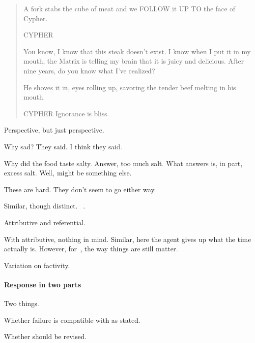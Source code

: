 \begin{note}
  \begin{quote}
    A fork stabs the cube of meat and we FOLLOW it UP TO the face of Cypher.

    CYPHER

    You know, I know that this steak doesn't exist.
    I know when I put it in my mouth, the Matrix is telling my brain that it is juicy and delicious.
    After nine years, do you know what I've realized?

    He shoves it in, eyes rolling up, savoring the tender beef melting in his mouth.

    CYPHER
    Ignorance is bliss.
  \end{quote}

  Perspective, but just perspective.
\end{note}


\begin{note}
  Why sad?
  They said.
  I think they said.

  Why did the food taste salty.
  Answer, too much salt.
  What answers is, in part, excess salt.
  Well, might be something else.

  {
    \color{red}
    These are hard.
    They don't seem to go either way.
  }
\end{note}

\begin{note}
  Similar, though distinct.
  ~\cite{Donnellan:1966wt}.

  Attributive and referential.

  With attributive, nothing in mind.
  Similar, here the agent gives up what the time actually is.
  However, for~\citeauthor{Donnellan:1966wt}, the way things are still matter.
\end{note}


\begin{note}
  Variation on factivity.
\end{note}


\paragraph{Response in two parts}

\begin{note}
  Two things.

  Whether failure is compatible with \qzS{} as stated.

  Whether \qzS{} should be revised.
\end{note}

